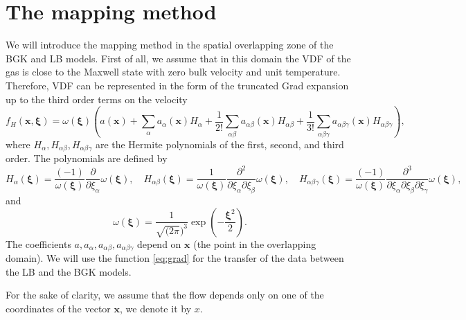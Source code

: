 \documentclass{elsarticle} %
\newcommand{\bxi}{\boldsymbol{\xi}}
\newcommand{\bx}{\boldsymbol{x}}
\newcommand{\ai}{a_{\alpha}}
\newcommand{\aij}{a_{\alpha\beta}}
\newcommand{\aijk}{a_{\alpha\beta\gamma}}
\newcommand{\Hi}{H_{\alpha}}
\newcommand{\Hij}{H_{\alpha\beta}}
\newcommand{\Hijk}{H_{\alpha\beta\gamma}}
\begin{document}

\section{The mapping method}\label{sec:mapping}

We will introduce the mapping method in the spatial overlapping zone of the BGK and LB models.
First of all, we assume that in this domain the VDF of the gas is close to the Maxwell state with zero bulk velocity and unit temperature.
Therefore, VDF can be represented in the form of the truncated Grad expansion up to the third order terms on the velocity
\begin{equation}\label{eq:grad}
    f_H(\bx,\bxi) = \omega(\bxi)\left(a(\bx) +\sum_{\alpha}\ai(\bx)\Hi+\frac{1}{2!}\sum_{\alpha\beta}
    \aij(\bx)\Hij+\frac{1}{3!}\sum_{\alpha\beta \gamma}\aijk(\bx)\Hijk\right),
\end{equation}
where $\Hi, \Hij, \Hijk$ are the Hermite polynomials of the first, second, and third order. The polynomials are defined by
\begin{equation}
H_\alpha(\bxi)=\frac{(-1)}{\omega(\bxi)}\frac{\partial}{\partial \xi_\alpha}\omega(\bxi),  \quad \Hij(\bxi)=\frac{1}{\omega(\bxi)}\frac{\partial^2}{\partial \xi_\alpha\partial \xi_\beta}\omega(\bxi),
\quad \Hijk(\bxi)=\frac{(-1)}{\omega(\bxi)}
\frac{\partial^3}{\partial \xi_\alpha\partial \xi_\beta \partial \xi_\gamma}\omega(\bxi),
\end{equation}
and
\begin{equation}
 \omega(\bxi)= \frac{1}{\sqrt{(2\pi})^3}\exp\left(-\frac{\bxi^2}{2}\right).
\end{equation}
 The coefficients $a, \ai,\aij, \aijk$ depend on $\bx$ (the point in the overlapping domain).
 We will use the function \eqref{eq:grad} for the transfer of the data between the LB and the BGK models.

For the sake of clarity, we assume that the flow depends only on one of the coordinates of the vector $\bx$, we denote it by $x$.
\end{document}
